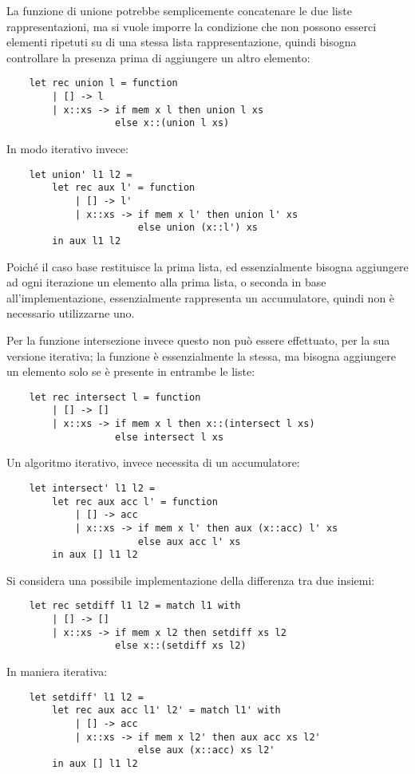\documentclass{article}
\numberwithin{equation}{subsection}
\begin{document}
La funzione di unione potrebbe semplicemente concatenare le due liste rappresentazioni, ma si vuole imporre la condizione che non possono esserci elementi ripetuti su di una stessa lista rappresentazione, quindi bisogna controllare la presenza prima di aggiungere un altro elemento:
\begin{verbatim}
    let rec union l = function
        | [] -> l
        | x::xs -> if mem x l then union l xs
                   else x::(union l xs)    
\end{verbatim}
In modo iterativo invece:
\begin{verbatim}
    let union' l1 l2 = 
        let rec aux l' = function
            | [] -> l'
            | x::xs -> if mem x l' then union l' xs
                       else union (x::l') xs
        in aux l1 l2
\end{verbatim}
Poiché il caso base restituisce la prima lista, ed essenzialmente bisogna aggiungere ad ogni iterazione un elemento alla prima lista, o seconda in base all'implementazione, essenzialmente rappresenta un accumulatore, quindi non è necessario utilizzarne uno. 

Per la funzione intersezione invece questo non può essere effettuato, per la sua versione iterativa; la funzione è essenzialmente la stessa, ma bisogna aggiungere un elemento solo se è presente in entrambe le liste:
\begin{verbatim}
    let rec intersect l = function
        | [] -> []
        | x::xs -> if mem x l then x::(intersect l xs)
                   else intersect l xs
\end{verbatim}
Un algoritmo iterativo, invece necessita di un accumulatore:
\begin{verbatim}
    let intersect' l1 l2 = 
        let rec aux acc l' = function
            | [] -> acc 
            | x::xs -> if mem x l' then aux (x::acc) l' xs
                       else aux acc l' xs
        in aux [] l1 l2    
\end{verbatim}

Si considera una possibile implementazione della differenza tra due insiemi:
\begin{verbatim}
    let rec setdiff l1 l2 = match l1 with 
        | [] -> []
        | x::xs -> if mem x l2 then setdiff xs l2
                   else x::(setdiff xs l2)
\end{verbatim}
In maniera iterativa:
\begin{verbatim}
    let setdiff' l1 l2 =
        let rec aux acc l1' l2' = match l1' with
            | [] -> acc
            | x::xs -> if mem x l2' then aux acc xs l2'
                       else aux (x::acc) xs l2'
        in aux [] l1 l2
\end{verbatim}
\end{document}
